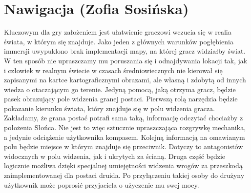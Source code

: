 \section{Nawigacja (Zofia Sosińska)}\label{chap:naw}

    Kluczowym dla gry założeniem jest ułatwienie graczowi wczucia się w realia świata, w którym się znajduje. Jako jeden z głównych warunków pogłębienia immersji uwypuklono brak implementacji mapy, na której gracz widziałby świat. W ten sposób nie upraszczamy mu poruszania się i odnajdywania lokacji tak, jak i człowiek w realnym świecie w czasach średniowiecznych nie kierował się zapisanymi na kartce kartograficznymi obrazami, ale własną i zdobytą od innych wiedza o otaczającym go terenie. 
    Jedyną pomocą, jaką otrzyma gracz, będzie pasek obrazujący pole widzenia granej postaci. Pierwszą rolą narzędzia będzie pokazanie kierunku świata, który znajduje się w polu widzenia gracza. Zakładamy, że grana postać potrafi sama taką, informację odczytać chociażby z położenia Słońca. Nie jest to więc sztucznie upraszczająca rozgrywkę mechanika, a jedynie odciążenie użytkownika kompasem. 
    Kolejną informacją na omawianym polu będzie miejsce w którym znajduje się przeciwnik. Dotyczy to antagonistów widocznych w polu widzenia, jak i ukrytych za ścianą. Druga część będzie logicznie możliwa dzięki specjalnej umiejętności widzenia wrogów za przeszkodą zaimplementowanej dla postaci druida. Po przyłączeniu takiej osoby do drużyny użytkownik może poprosić przyjaciela o użyczenie mu swej mocy.
